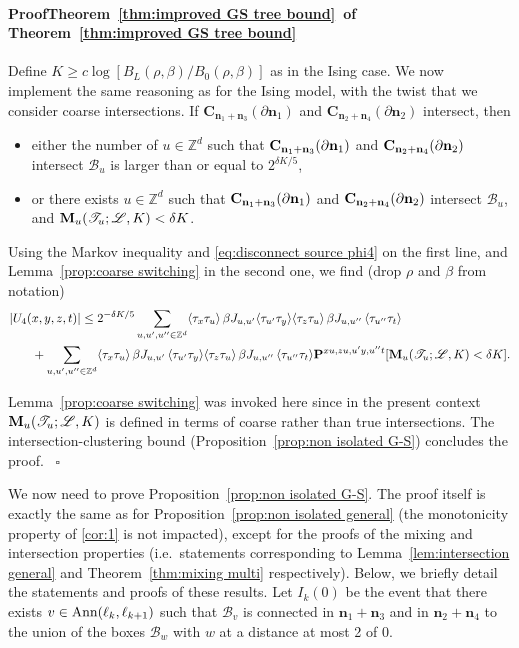 \documentclass[a4paper,oneside,11pt]{article}
\def\Z{\mathbb{Z}}                          %
\numberwithin{equation}{section}
\numberwithin{equation}{section}
\numberwithin{equation}{section}
\newenvironment{proof}[1][\relax]%
  {\paragraph{Proof\ifx#1\relax\else~of #1\fi}}%
  {~\hfill$\square$\par\bigskip}
\newcommand{\calB}{\mathcal{B}}
\newcommand{\calL}{\mathcal{L}}
\newcommand{\calT}{\mathcal{T}}
\def\Z{\mathbb{Z}}                          %
\newcommand{\n}{\mathbf{n}}
\begin{document}
\begin{proof}[Theorem~\ref{thm:improved GS tree bound}]
 Define $K\ge c\log [B_L(\rho,\beta)/B_0(\rho,\beta)]$ as in the Ising case. 
We now implement the same reasoning as for the Ising model, with the twist that we consider coarse intersections. If ${\mathbf C}_{\n_1+\n_3}(\partial\n_1)$ and ${\mathbf C}_{\n_2+\n_4}(\partial\n_2)$ intersect, then
\begin{itemize}
\item either the number of $u\in \Z^d$ such that ${\bf C}_{\n_1+\n_3}(\partial\n_1)$ and ${\bf C}_{\n_2+\n_4}(\partial\n_2)$ intersect $\calB_u$ is larger than or equal to $2^{\delta K/5}$,
\item or there exists $u\in\Z^d$ such that 
${\bf C}_{\n_1+\n_3}(\partial\n_1)$ and ${\bf C}_{\n_2+\n_4}(\partial\n_2)$ intersect $\calB_u$,
and ${\bf M}_u(\calT_u;\calL,K)<\delta K$. 
\end{itemize}
Using the Markov inequality and \eqref{eq:disconnect source phi4} on the first line, and Lemma~\ref{prop:coarse switching} in the second one, we find (drop $\rho$ and $\beta$ from notation)
\begin{align}
|U_4(&x,y,z,t)|\le 2^{-\delta K/5}\sum_{u,u',u''\in\Z^d}\langle\tau_x\tau_u\rangle\,\beta J_{u,u'}\langle\tau_{u'}\tau_y\rangle\langle\tau_z\tau_u\rangle\,\beta J_{u,u''}\,\langle\tau_{u''}\tau_t\rangle\nonumber\\
&+\sum_{u,u',u''\in\Z^d}\langle\tau_x\tau_u\rangle\,\beta J_{u,u'}\,\langle\tau_{u'}\tau_y\rangle\langle\tau_z\tau_u\rangle\,\beta J_{u,u''}\,\langle\tau_{u''}\tau_t\rangle{\bf P}^{xu,zu,u'y,u''t}[{\bf M}_{u}(\calT_u;\calL,K)<\delta K].
\end{align}

Lemma~\ref{prop:coarse switching} was invoked here since in the present context ${\bf M}_{u}(\calT_u;\calL,K)$  is defined in terms of coarse rather than true intersections. 
The intersection-clustering bound (Proposition~\ref{prop:non isolated G-S}) concludes the proof.
\end{proof}

We now need to prove Proposition~\ref{prop:non isolated G-S}. The proof  itself is exactly the same as for Proposition~\ref{prop:non isolated general} (the monotonicity property of \eqref{cor:1} is not impacted), except for the proofs of the mixing and intersection properties (i.e.~statements corresponding to Lemma~\ref{lem:intersection general} and Theorem~\ref{thm:mixing multi} respectively). Below, we briefly detail the statements and proofs of these results. Let $I_k(0)$ be the event that there exists $v\in {\rm Ann}(\ell_k,\ell_{k+1})$ such that $\calB_v$ is connected in $\n_1+\n_3$ and in $\n_2+\n_4$ to the union of the boxes $\calB_{w}$ with $w$ at a distance at most 2 of $0$.
\end{document}
